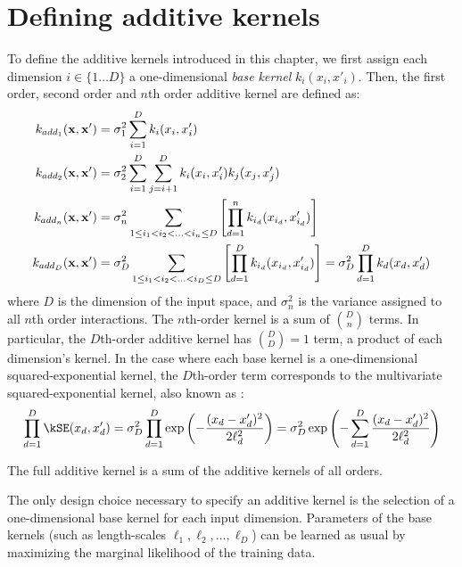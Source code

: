 



\section{Defining additive kernels}

To define the additive kernels introduced in this chapter, we first assign each dimension $i \in \{1 \dots D\}$ a one-dimensional \emph{base kernel} $k_i(x_i, x'_i)$.
Then, the first order, second order and $n$th order additive kernel are defined as:
%
\begin{align}
k_{add_1}({\bf x, x'}) & = \sigma_1^2 \sum_{i=1}^D k_i(x_i, x_i') \\
k_{add_2}({\bf x, x'}) & = \sigma_2^2 \sum_{i=1}^D \sum_{j = i + 1}^D k_i(x_i, x_i') k_j(x_j, x_j') \\
k_{add_n}({\bf x, x'}) & = \sigma_n^2 \sum_{1 \leq i_1 < i_2 < ... < i_n \leq D} \left[ \prod_{d=1}^n k_{i_d}(x_{i_d}, x_{i_d}') \right] \\
k_{add_D}({\bf x, x'}) & = \sigma_D^2 \sum_{1 \leq i_1 < i_2 < ... < i_D \leq D} \left[ \prod_{d=1}^D k_{i_d}(x_{i_d}, x_{i_d}') \right] = \sigma_D^2 \prod_{d=1}^D k_{d}(x_{d}, x_{d}')
\end{align}
%
where $D$ is the dimension of the input space, and $\sigma_n^2$ is the variance assigned to all $n$th order interactions.
The $n$th-order kernel is a sum of ${D \choose n}$ terms.
In particular, the $D$th-order additive kernel has ${D \choose D} = 1$ term, a product of each dimension's kernel.
In the case where each base kernel is a one-dimensional squared-exponential kernel, the $D$th-order term corresponds to the multivariate squared-exponential kernel, also known as \seard{}:
%
\begin{align}
\prod_{d=1}^D \kSE(x_d, x_d') = 
\sigma_D^2 \prod_{d=1}^D \exp \left( -\frac{ ( x_{d} - x_{d}')^2}{2 \ell^2_d} \right) = 
\sigma_D^2 \exp \left( -\sum_{d=1}^D \frac{ ( x_{d} - x_{d}')^2}{2 \ell^2_d} \right)
\end{align}
%

The full additive kernel is a sum of the additive kernels of all orders.

The only design choice necessary to specify an additive kernel is the selection of a one-dimensional base kernel for each input dimension.
Parameters of the base kernels (such as length-scales $\ell_1, \ell_2, \dots, \ell_D$) can be learned as usual by maximizing the marginal likelihood of the training data.

